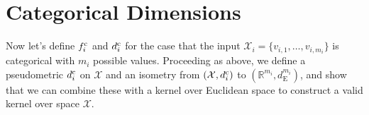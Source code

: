 \documentclass[letterpaper]{article}
\newcommand{\vect}[1]{\underline{\smash{#1}}}
\renewcommand{\v}[1]{\vect{#1}}
\newcommand{\reals}{\mathds{R}}
\newcommand{\sX}{\mathcal{X}}
\newcommand{\br}{^{\text{\textnormal{ r}}}}
\newcommand{\cat}{^{\text{\textnormal{c}}}}
\begin{document}
% 
% 
% 
% 







\section{Categorical Dimensions}

Now let's define $f\cat_i$ and $d\cat_i$ for the case that the input $\sX_i=\{v_{i,1}, \dots, v_{i,m_i}\}$ is categorical with $m_i$ possible values. 
Proceeding as above, we define a pseudometric $d\cat_i$ on $\sX$ and an isometry from $(\sX, d\cat_i)$ to $(\reals^{m_i},d_{\text{E}}^{m_i})$, and show that we can combine these
with a kernel over Euclidean space to construct a valid kernel over space $\sX$. 
\end{document}
